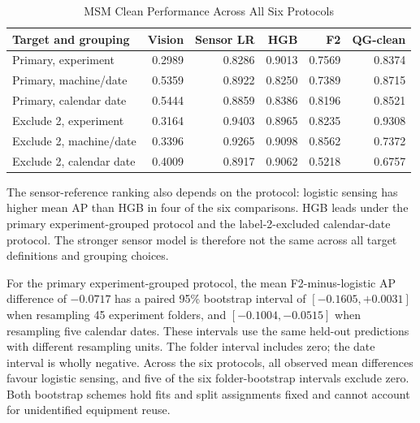 \begin{table}[htbp]
\caption{MSM Clean Performance Across All Six Protocols}\label{tab:msm-sensitivity}
\centering\small
\setlength{\tabcolsep}{4pt}
\begin{tabular}{lrrrrr}\toprule
Target and grouping & Vision & Sensor LR & HGB & F2 & QG-clean\\\midrule
Primary, experiment & 0.2989 & 0.8286 & 0.9013 & 0.7569 & 0.8374\\
Primary, machine/date & 0.5359 & 0.8922 & 0.8250 & 0.7389 & 0.8715\\
Primary, calendar date & 0.5444 & 0.8859 & 0.8386 & 0.8196 & 0.8521\\
Exclude 2, experiment & 0.3164 & 0.9403 & 0.8965 & 0.8235 & 0.9308\\
Exclude 2, machine/date & 0.3396 & 0.9265 & 0.9098 & 0.8562 & 0.7372\\
Exclude 2, calendar date & 0.4009 & 0.8917 & 0.9062 & 0.5218 & 0.6757\\
\bottomrule\end{tabular}
\end{table}

The sensor-reference ranking also depends on the protocol: logistic sensing has higher
mean AP than HGB in four of the six comparisons. HGB leads under the primary
experiment-grouped protocol and the label-2-excluded calendar-date protocol. The stronger sensor model is therefore not the same
across all target definitions and grouping choices.

For the primary experiment-grouped protocol, the mean F2-minus-logistic AP difference
of $-0.0717$ has a paired 95\% bootstrap interval of $[-0.1605, +0.0031]$ when
resampling 45 experiment folders, and $[-0.1004, -0.0515]$ when resampling five calendar
dates. These intervals use the same held-out predictions with different resampling
units. The folder interval includes zero; the date interval is wholly negative. Across
the six protocols, all observed mean differences favour logistic sensing, and five of
the six folder-bootstrap intervals exclude zero. Both bootstrap schemes hold fits and
split assignments fixed and cannot account for unidentified equipment reuse.

